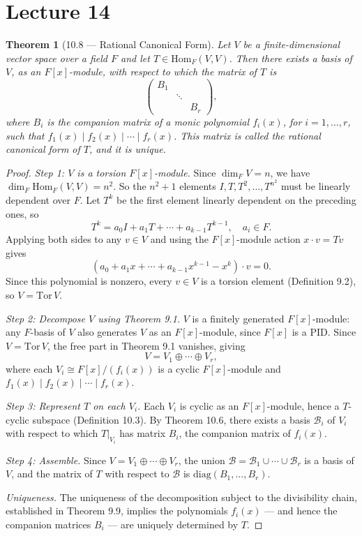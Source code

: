 \documentclass[12pt]{article}
\newtheorem{theorem}{Theorem}
\begin{document}
\section*{Lecture 14}

\begin{theorem}[10.8 — Rational Canonical Form]
Let $V$ be a finite-dimensional vector space over a field $F$ and let $T \in \mathrm{Hom}_F(V,V)$. Then there exists a basis of $V$, as an $F[x]$-module, with respect to which the matrix of $T$ is
\[
\begin{pmatrix}
B_1 & & \\
& \ddots & \\
& & B_r
\end{pmatrix},
\]
where $B_i$ is the companion matrix of a monic polynomial $f_i(x)$, for $i = 1, \ldots, r$, such that $f_1(x) \mid f_2(x) \mid \cdots \mid f_r(x)$. This matrix is called the \emph{rational canonical form} of $T$, and it is unique.
\end{theorem}

\begin{proof}
\textit{Step 1: $V$ is a torsion $F[x]$-module.} Since $\dim_F V = n$, we have $\dim_F \mathrm{Hom}_F(V,V) = n^2$. So the $n^2+1$ elements $I, T, T^2, \ldots, T^{n^2}$ must be linearly dependent over $F$. Let $T^k$ be the first element linearly dependent on the preceding ones, so
\[
  T^k = a_0 I + a_1 T + \cdots + a_{k-1}T^{k-1}, \quad a_i \in F.
\]
Applying both sides to any $v \in V$ and using the $F[x]$-module action $x \cdot v = Tv$ gives
\[
  (a_0 + a_1 x + \cdots + a_{k-1}x^{k-1} - x^k) \cdot v = 0.
\]
Since this polynomial is nonzero, every $v \in V$ is a torsion element (Definition 9.2), so $V = \mathrm{Tor}\,V$.

\textit{Step 2: Decompose $V$ using Theorem 9.1.} $V$ is a finitely generated $F[x]$-module: any $F$-basis of $V$ also generates $V$ as an $F[x]$-module, since $F[x]$ is a PID. Since $V = \mathrm{Tor}\,V$, the free part in Theorem 9.1 vanishes, giving
\[
  V = V_1 \oplus \cdots \oplus V_r,
\]
where each $V_i \cong F[x]/(f_i(x))$ is a cyclic $F[x]$-module and $f_1(x) \mid f_2(x) \mid \cdots \mid f_r(x)$.

\textit{Step 3: Represent $T$ on each $V_i$.} Each $V_i$ is cyclic as an $F[x]$-module, hence a $T$-cyclic subspace (Definition 10.3). By Theorem 10.6, there exists a basis $\mathcal{B}_i$ of $V_i$ with respect to which $T|_{V_i}$ has matrix $B_i$, the companion matrix of $f_i(x)$.

\textit{Step 4: Assemble.} Since $V = V_1 \oplus \cdots \oplus V_r$, the union $\mathcal{B} = \mathcal{B}_1 \cup \cdots \cup \mathcal{B}_r$ is a basis of $V$, and the matrix of $T$ with respect to $\mathcal{B}$ is $\mathrm{diag}(B_1, \ldots, B_r)$.

\textit{Uniqueness.} The uniqueness of the decomposition subject to the divisibility chain, established in Theorem 9.9, implies the polynomials $f_i(x)$ — and hence the companion matrices $B_i$ — are uniquely determined by $T$.
\end{proof}
\end{document}
